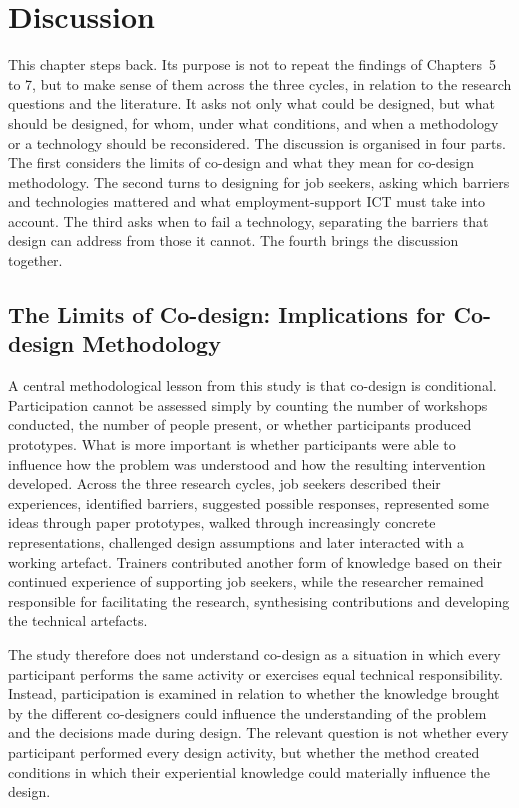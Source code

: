 \chapter{Discussion}

\begin{chapterintro}
This chapter steps back. Its purpose is not to repeat the findings of Chapters~5 to 7, but to make sense of them across the three cycles, in relation to the research questions and the literature. It asks not only what could be designed, but what should be designed, for whom, under what conditions, and when a methodology or a technology should be reconsidered. The discussion is organised in four parts. The first considers the limits of co-design and what they mean for co-design methodology. The second turns to designing for job seekers, asking which barriers and technologies mattered and what employment-support ICT must take into account. The third asks when to fail a technology, separating the barriers that design can address from those it cannot. The fourth brings the discussion together.
\end{chapterintro}


\section{The Limits of Co-design: Implications for Co-design Methodology}

A central methodological lesson from this study is that co-design is conditional. Participation cannot be assessed simply by counting the number of workshops conducted, the number of people present, or whether participants produced prototypes. What is more important is whether participants were able to influence how the problem was understood and how the resulting intervention developed. Across the three research cycles, job seekers described their experiences, identified barriers, suggested possible responses, represented some ideas through paper prototypes, walked through increasingly concrete representations, challenged design assumptions and later interacted with a working artefact. Trainers contributed another form of knowledge based on their continued experience of supporting job seekers, while the researcher remained responsible for facilitating the research, synthesising contributions and developing the technical artefacts.

The study therefore does not understand co-design as a situation in which every participant performs the same activity or exercises equal technical responsibility. Instead, participation is examined in relation to whether the knowledge brought by the different co-designers could influence the understanding of the problem and the decisions made during design. The relevant question is not whether every participant performed every design activity, but whether the method created conditions in which their experiential knowledge could materially influence the design.


